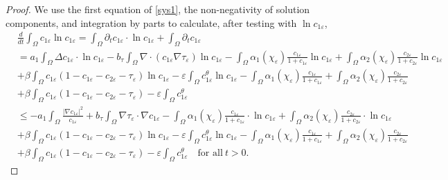 \documentclass[a4paper,10pt]{article}
\theoremstyle{definition}
\begin{document}
\begin{proof}
  We use the first equation of \eqref{sys1}, the non-negativity of solution components, and integration by parts to calculate, after testing with $\ln c_{1\varepsilon}$,
  \begin{align}
  \label{cient11}
    \nonumber & \frac{d}{dt} \int_\Omega c_{1\varepsilon} \ln c_{1\varepsilon}  = \int_\Omega \partial_t c_{1\varepsilon} \cdot \ln c_{1\varepsilon} + \int_\Omega \partial_t c_{1\varepsilon}   \\[5pt]
    \nonumber &=  a_1 \int_\Omega \Delta c_{1\varepsilon} \cdot \ln c_{1\varepsilon}  - b_{\tau}\int_\Omega \nabla \cdot \left(c_{1\varepsilon}  \nabla \tau_\varepsilon\right) \ln c_{1\varepsilon} - \int_\Omega \alpha_1(\chi_\varepsilon)  \tfrac{c_{1\varepsilon}}{1 + c_{1\varepsilon}} \ln c_{1\varepsilon} + \int_\Omega  \alpha_2(\chi_\varepsilon) \tfrac{c_{2\varepsilon}}{1 + c_{2\varepsilon}}   \ln c_{1\varepsilon}  \\[5pt]
    \nonumber &  + \beta \int_\Omega c_{1\varepsilon}(1 - c_{1\varepsilon} -  c_{2\varepsilon} - \tau_\varepsilon)\ln c_{1\varepsilon}  - \varepsilon \int_\Omega c_{1\varepsilon}^\theta \ln c_{1 \varepsilon}  - \int_\Omega \alpha_1(\chi_\varepsilon) \tfrac{c_{1\varepsilon}}{1 + c_{1\varepsilon}} + \int_\Omega \alpha_2(\chi_\varepsilon) \tfrac{c_{2\varepsilon}}{1 + c_{2\varepsilon}} \\[5pt]
    \nonumber &  + \beta \int_\Omega c_{1\varepsilon}(1 - c_{1\varepsilon} -  c_{2\varepsilon} - \tau_\varepsilon) - \varepsilon \int_\Omega c_{1\varepsilon}^\theta \\[5pt]
    \nonumber & \leq - a_1 \int_\Omega \frac{|\nabla c_{1\varepsilon}|^2}{c_{1\varepsilon}} + b_\tau \int_\Omega  \nabla \tau_\varepsilon \cdot \nabla c_{1\varepsilon} - \int_\Omega \alpha_1(\chi_\varepsilon)  \tfrac{c_{1\varepsilon}}{1 + c_{1\varepsilon}} \cdot \ln c_{1\varepsilon} + \int_\Omega  \alpha_2(\chi_\varepsilon) \tfrac{c_{2\varepsilon}}{1 + c_{2\varepsilon}}  \cdot \ln c_{1\varepsilon}  \\[5pt]
    & \nonumber   + \beta \int_\Omega c_{1\varepsilon}(1 - c_{1\varepsilon} -  c_{2\varepsilon} - \tau_\varepsilon)\ln c_{1\varepsilon} - \varepsilon \int_\Omega c_{1\varepsilon}^\theta \ln c_{1 \varepsilon}  - \int_\Omega \alpha_1(\chi_\varepsilon) \tfrac{c_{1\varepsilon}}{1 + c_{1\varepsilon}} + \int_\Omega \alpha_2(\chi_\varepsilon) \tfrac{c_{2\varepsilon}}{1 + c_{2\varepsilon}} \\[5pt]
    & + \beta \int_\Omega c_{1\varepsilon}(1 - c_{1\varepsilon} -  c_{2\varepsilon} - \tau_\varepsilon)  - \varepsilon \int_\Omega c_{1\varepsilon}^\theta  \quad \text{for all}~ t > 0.

\end{align}
\end{proof}
\end{document}
